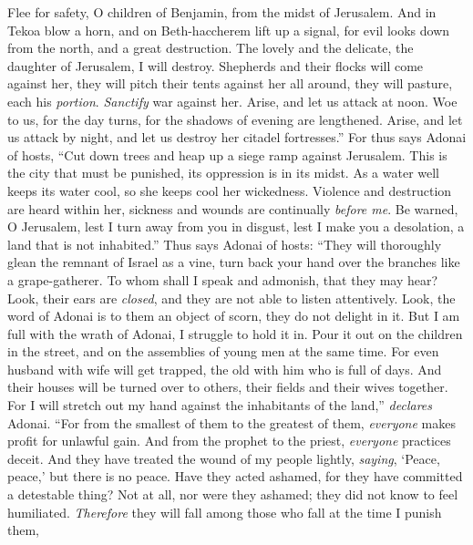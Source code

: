 \begin{biblechapter} %
\verse Flee for safety, O children of Benjamin, 
from the midst of Jerusalem. 
And in Tekoa blow a horn, 
and on Beth-haccherem lift up a signal, 
for evil looks down from the north, 
and a great destruction.
\verse The lovely and the delicate, 
the daughter of Jerusalem, I will destroy.
\verse Shepherds and their flocks will come against her, 
they will pitch their tents against her all around, 
they will pasture, each his \textit{portion}.
\verse \textit{Sanctify} war against her. 
Arise, and let us attack at noon. 
Woe to us, for the day turns, 
for the shadows of evening are lengthened.
\verse Arise, and let us attack by night, 
and let us destroy her citadel fortresses.”
\verse For thus says Adonai of hosts, 
“Cut down trees and heap up a siege ramp against Jerusalem. 
This is the city that must be punished, 
its oppression is in its midst.
\verse As a water well keeps its water cool, 
so she keeps cool her wickedness. 
Violence and destruction are heard within her, 
sickness and wounds are continually \textit{before me}.
\verse Be warned, O Jerusalem, 
lest I turn away from you in disgust, 
lest I make you a desolation, 
a land that is not inhabited.”
\verse Thus says Adonai of hosts: 
“They will thoroughly glean the remnant of Israel as a vine, 
turn back your hand over the branches like a grape-gatherer.
\verse To whom shall I speak and admonish, 
that they may hear? 
Look, their ears are \textit{closed}, 
and they are not able to listen attentively. 
Look, the word of Adonai is to them an object of scorn, 
they do not delight in it.
\verse But I am full with the wrath of Adonai, 
I struggle to hold it in. 
Pour it out on the children in the street, 
and on the assemblies of young men at the same time. 
For even husband with wife will get trapped, 
the old with him who is full of days.
\verse And their houses will be turned over to others, 
their fields and their wives together. 
For I will stretch out my hand 
against the inhabitants of the land,” \textit{declares} Adonai.
\verse “For from the smallest of them to the greatest of them, 
\textit{everyone} makes profit for unlawful gain. 
And from the prophet to the priest, 
\textit{everyone} practices deceit.
\verse And they have treated the wound of my people lightly, 
\textit{saying}, ‘Peace, peace,’ but there is no peace.
\verse Have they acted ashamed, for they have committed a detestable thing? 
Not at all, nor were they ashamed; they did not know to feel humiliated. 
\textit{Therefore} they will fall among those who fall at the time I punish them, 

\end{biblechapter}

